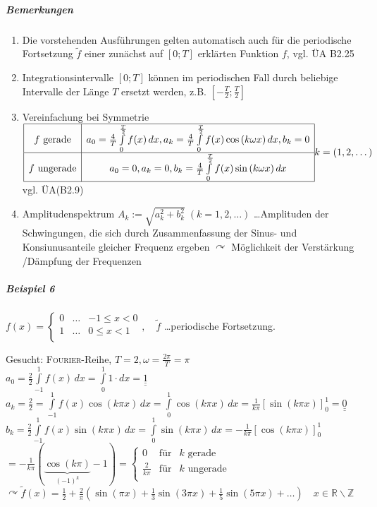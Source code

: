 \documentclass[a4paper]{scrartcl}
\begin{document}
\subparagraph{Bemerkungen}
\begin{enumerate}
\item Die vorstehenden Ausführungen gelten automatisch auch für die periodische Fortsetzung $\tilde{f}$ einer zunächst auf $[0;T]$ erklärten Funktion $f$, vgl. ÜA B2.25
\item Integrationsintervalle $[0;T]$ können im periodischen Fall durch beliebige Intervalle der Länge $T$ ersetzt werden, z.B. $\left [ -\frac{T}{2}; \frac{T}{2} \right ]$
\item Vereinfachung bei Symmetrie\\
$\begin{array}{|c|c|}\hline
f \text{ gerade} & a_0 = \frac{4}{T} \int\limits_0^{\frac{T}{2}} f(x) \, dx , a_k = \frac{4}{T} \int\limits_0^{\frac{T}{2}} f(x) \cos{(k \omega x)} \, dx , b_k=0\\ \hline
f \text{ ungerade} & a_0=0, a_k=0, b_k= \frac{4}{T} \int\limits_0^{\frac{T}{2}} f(x) \sin{(k\omega x)} \, dx \\ \hline
\end{array}\\
k=(1,2,\dots)$ vgl. ÜA(B2.9)
\item Amplitudenspektrum $A_k := \sqrt{a_k^2 + b_k^2} \; (k=1,2,\dots)$ \dots Amplituden der Schwingungen, die sich durch Zusammenfassung der Sinus- und Konsiunusanteile gleicher Frequenz ergeben $\curvearrowright$ Möglichkeit der Verstärkung /Dämpfung der Frequenzen
\end{enumerate}

\subparagraph{Beispiel 6} $f(x) = \left \{ \begin{array}{lcr} 0 & \dots & -1 \leq x <0 \\ 1 & \dots & 0 \leq x <1\\ \end{array} \right. , \quad \tilde{f}$ \dots periodische Fortsetzung.

Gesucht: \textsc{Fourier}-Reihe, $T=2,\omega = \frac{2\pi}{T} = \pi $ \\
$a_0 = \frac{2}{2} \int\limits_{-1}^1 f(x) \, dx = \int\limits_0^1 1 \cdot dx = \underline{\underline{1}}$\\
$a_k = \frac{2}{2} = \int\limits_{-1}^{1} f(x) \cos{(k\pi x)} \, dx = \int\limits_0^1 \cos{(k \pi x)} \, dx = \frac{1}{k \pi} \left [ \sin{(k \pi x)} \right ]_0^1 = \underline{\underline{0}}$\\
$b_k= \frac{2}{2} \int\limits_{-1}^{1} f(x) \sin{(k \pi x)} \, dx = \int\limits_0^1 \sin{(k \pi x)} \, dx =  - \frac{1}{k \pi} \left [ \cos{(k \pi x )} \right ]_0^1$\\
$= -\frac{1}{k\pi} (\underbrace{\cos{(k \pi)}}_{(-1)^k} -1) = \left \{ \begin{array}{lcr} 0 & \text{für} & k \text{ gerade} \\
\frac{2}{k\pi} & \text{für} & k \text{ ungerade} \\ \end{array} \right.$\\
$\curvearrowright \tilde{f} (x) = \frac{1}{2} + \frac{2}{\pi} ( \sin{(\pi x)} + \frac{1}{3} \sin{( 3 \pi  x)} + \frac{1}{5} \sin{(5 \pi x) } + \dots ) \quad x \in \mathbb{R} \backslash \mathbb{Z}$
\end{document}
